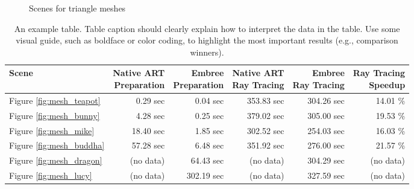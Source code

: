 \begin{figure}
	\hfill
	
	\caption{Scenes for triangle meshes}
	\label{fig:mesh_scenes}
\end{figure}


\begin{table}
	\centering
	{\footnotesize\sf
		\begin{tabular}{lrrrrr}
			\toprule
			Scene  & \thead{Native ART \\ Preparation} & \thead{Embree \\ Preparation}  & \thead{Native ART \\ Ray Tracing} & \thead{Embree \\ Ray Tracing} &  \thead{Ray Tracing \\ Speedup}\\ 
			\midrule
			Figure \ref{fig:mesh_teapot} & 0.29 sec & 0.04 sec & 353.83 sec & 304.26 sec &  14.01 \% \\
			Figure \ref{fig:mesh_bunny}  & 4.28 sec & 0.25 sec & 379.02 sec & 305.00 sec &  19.53 \% \\
			Figure \ref{fig:mesh_mike} & 18.40 sec & 1.85 sec &  302.52 sec & 254.03 sec &  16.03 \%  \\
			\addlinespace %
			Figure \ref{fig:mesh_buddha}  & 57.28 sec & 6.48 sec & 351.92 sec & 276.00 sec &  21.57 \% \\
			Figure \ref{fig:mesh_dragon} & (no data)  & 64.43 sec & (no data) & 304.29 sec & (no data)  \\
			Figure \ref{fig:mesh_lucy}  & (no data) & 302.19 sec & (no data) & 327.59 sec & (no data)  \\
			\bottomrule
	\end{tabular}}
	\caption{An example table. Table caption should clearly explain how to interpret the data in the table. Use some visual guide, such as boldface or color coding, to highlight the most important results (e.g., comparison winners).}
	\label{tab:mesh}
\end{table}

